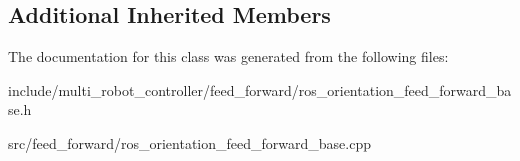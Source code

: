 \subsection*{Additional Inherited Members}


The documentation for this class was generated from the following files\+:\begin{DoxyCompactItemize}
\item 
include/multi\+\_\+robot\+\_\+controller/feed\+\_\+forward/ros\+\_\+orientation\+\_\+feed\+\_\+forward\+\_\+base.\+h\item 
src/feed\+\_\+forward/ros\+\_\+orientation\+\_\+feed\+\_\+forward\+\_\+base.\+cpp\end{DoxyCompactItemize}
